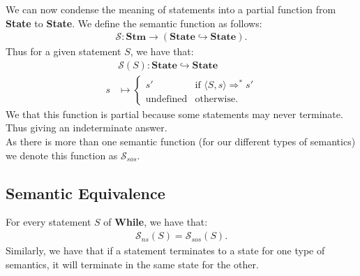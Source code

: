 We can now condense the meaning of statements into a partial
function from \textbf{State} to \textbf{State}. We define the semantic
function as follows: \begin{gather*}
  \mathcal{S}: \textbf{Stm} \to (\textbf{State} \hookrightarrow \textbf{State}).
\end{gather*} Thus for a given statement $S$, we have that: \begin{align*}
  &\mathcal{S}(S) : \textbf{State} \hookrightarrow \textbf{State} \\
  s &\mapsto \begin{cases}
    s' & \text{if } \langle S, s \rangle \Rightarrow^* s' \\
    \text{undefined} & \text{otherwise}.
  \end{cases}
\end{align*} We that this function is partial because some statements
may never terminate. Thus giving an indeterminate answer.
\\[\baselineskip]
As there is more than one semantic function (for our different types
of semantics) we denote this function as $\mathcal{S}_{sos}$.

\subsection{Semantic Equivalence}

For every statement $S$ of \textbf{While}, we have that: \begin{gather*}
  \mathcal{S}_{ns}(S) = \mathcal{S}_{sos}(S).
\end{gather*} Similarly, we have that if a statement terminates to a state
for one type of semantics, it will terminate in the same state for the other.
